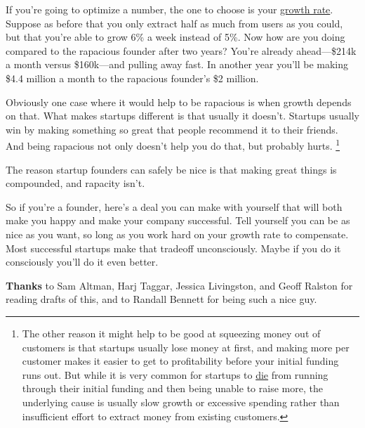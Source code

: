 If you're going to optimize a number, the one to choose is your
\href{growth.html}{growth rate}. Suppose as before that you only extract
half as much from users as you could, but that you're able to grow 6\% a
week instead of 5\%. Now how are you doing compared to the rapacious
founder after two years? You're already ahead---\$214k a month versus
\$160k---and pulling away fast. In another year you'll be making \$4.4
million a month to the rapacious founder's \$2 million.

Obviously one case where it would help to be rapacious is when growth
depends on that. What makes startups different is that usually it
doesn't. Startups usually win by making something so great that people
recommend it to their friends. And being rapacious not only doesn't help
you do that, but probably hurts. \footnote{The other reason it might help to be good at squeezing money out
of customers is that startups usually lose money at first, and making
more per customer makes it easier to get to profitability before your
initial funding runs out. But while it is very common for startups to
\href{pinch.html}{die} from running through their initial funding and
then being unable to raise more, the underlying cause is usually slow
growth or excessive spending rather than insufficient effort to extract
money from existing customers.}

The reason startup founders can safely be nice is that making great
things is compounded, and rapacity isn't.

So if you're a founder, here's a deal you can make with yourself that
will both make you happy and make your company successful. Tell yourself
you can be as nice as you want, so long as you work hard on your growth
rate to compensate. Most successful startups make that tradeoff
unconsciously. Maybe if you do it consciously you'll do it even better.


\textbf{Thanks} to Sam Altman, Harj Taggar, Jessica Livingston, and
Geoff Ralston for reading drafts of this, and to Randall Bennett for
being such a nice guy.